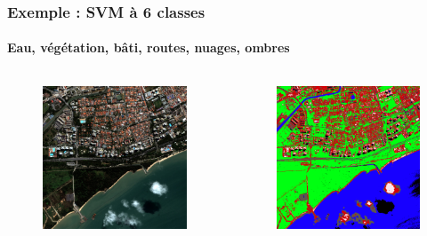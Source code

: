 \documentclass[compress,handout]{beamer}
\begin{document}
\begin{frame}
\frametitle{Exemple : SVM à 6 classes}
\framesubtitle{Eau, végétation, bâti, routes, nuages, ombres}
\begin{columns}
\begin{column}{0.5\textwidth}
\begin{figure}[]
  \includegraphics[width=1.0\textwidth]{radio2-extract-3b.jpg}
\end{figure}
\end{column}
\begin{column}{0.5\textwidth}
\begin{figure}[]
  \includegraphics[width=1.0\textwidth]{svm-6-classes.png}
\end{figure}
\end{column}
\end{columns}
\end{frame}
\end{document}
